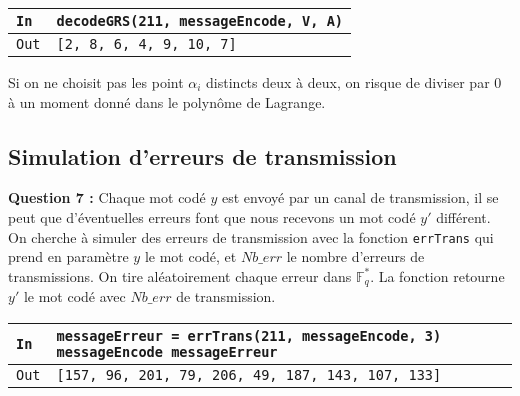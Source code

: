 \documentclass[titlepage]{article}
\begin{document}
        

        \begin{tabularx}{12cm}{|p{0.60cm}|X|}
            \hline
            \rowcolor{gray}
            \texttt{In}
            & 
            \texttt{decodeGRS(211, messageEncode, V, A)}
            \\
            \hline
            \texttt{Out}
            &
            \texttt{[2, 8, 6, 4, 9, 10, 7]}
            \\
            \hline
        \end{tabularx}
        \bigbreak

        Si on ne choisit pas les point $\alpha_i$ distincts deux à deux, on risque de diviser par 0 à un moment donné dans le polynôme de Lagrange.

        \subsection{Simulation d’erreurs de transmission}
        \textbf{Question 7 :}
        Chaque mot codé $y$ est envoyé par un canal de transmission, il se peut que d'éventuelles erreurs font que nous recevons un mot codé $y'$ différent.
        On cherche à simuler des erreurs de transmission avec la fonction \texttt{errTrans} qui prend en paramètre $y$ le mot codé, et $Nb\_err$ le nombre d'erreurs de transmissions.
        On tire aléatoirement chaque erreur dans $\mathbb{F}_q^*$. La fonction retourne $y'$ le mot codé avec $Nb\_err$ de transmission.

        

        \begin{tabularx}{12cm}{|p{0.60cm}|X|}
            \hline
            \rowcolor{gray}
            \texttt{In}
            & 
            \texttt{messageErreur = errTrans(211, messageEncode, 3) \newline
            messageEncode \newline
            messageErreur}
            \\
            \hline
            \texttt{Out}
            &
            \texttt{[157, 96, 201, 79, 206, 49, 187, 143, 107, 133]\newline
            [157, 86, 49, 79, 206, 49, 187, 32, 107, 133]}
            \\
            \hline
        \end{tabularx}
        \bigbreak
\end{document}
